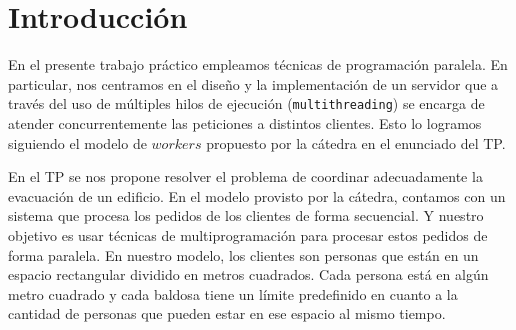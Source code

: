 \documentclass[11pt, a4paper, twoside]{article}
\begin{document}
\clearpage{\pagestyle{empty}}

\clearpage{%
  \pagestyle{empty}\tableofcontents%
  \vspace{3cm}%
  \cleardoublepage%
}
\setcounter{page}{1}

\section{Introducción}
En el presente trabajo práctico empleamos técnicas de programación paralela. En particular, nos centramos
en el diseño y la implementación de un servidor que a través del uso de múltiples hilos de ejecución
(\texttt{multithreading}) se encarga de atender concurrentemente las peticiones a distintos clientes. Esto
lo logramos siguiendo el modelo de $workers$ propuesto por la cátedra en el enunciado del TP.

En el TP se nos propone resolver el problema de coordinar adecuadamente la evacuación de un edificio. En el
modelo provisto por la cátedra, contamos con un sistema que procesa los pedidos de los clientes de forma
secuencial. Y nuestro objetivo es usar técnicas de multiprogramación para procesar estos pedidos de forma
paralela. En nuestro modelo, los clientes son personas que están en un espacio rectangular dividido en
metros cuadrados. Cada persona está en algún metro cuadrado y cada baldosa tiene un límite predefinido en
cuanto a la cantidad de personas que pueden estar en ese espacio al mismo tiempo.

\newpage
{}
\end{document}
